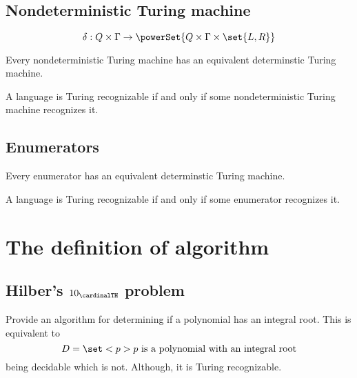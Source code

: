 \subsection{Nondeterministic Turing machine}
\begin{equation*}
    \delta: Q \times \Gamma \to \powerSet{Q \times \Gamma \times \set{L,R}}
\end{equation*}
\begin{theorem}
    Every nondeterministic Turing machine has an equivalent determinstic Turing machine.
\end{theorem}
\begin{corollary}
    A language is Turing recognizable if and only if some nondeterministic Turing machine recognizes it. 
\end{corollary}
\subsection{Enumerators}
\begin{theorem}
    Every enumerator has an equivalent determinstic Turing machine.
\end{theorem}
\begin{corollary}
    A language is Turing recognizable if and only if some enumerator recognizes it. 
\end{corollary}

\section{The definition of algorithm}
\subsection{Hilber's \(10_{\cardinalTH}\) problem}
Provide an algorithm for determining if a polynomial has an integral root. This is equivalent to 
\begin{equation*}
    D = \set<p>{p\ \text{is a polynomial with an integral root}}
\end{equation*}
being decidable which is not. Although, it is Turing recognizable.
